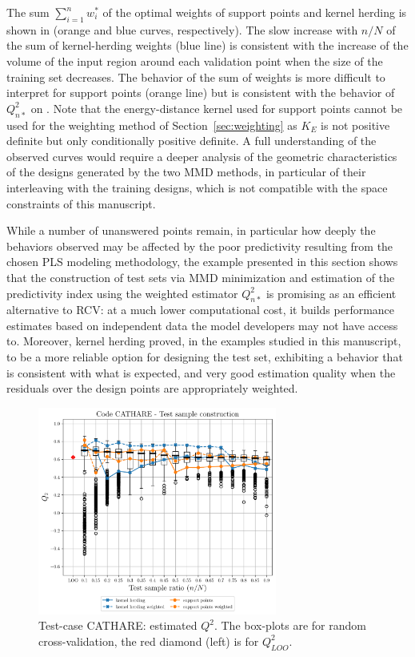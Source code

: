 The sum $\sum_{i=1}^n w_i^*$ of the optimal weights of support points and kernel herding  is shown in  (orange and blue curves, respectively). 
The slow increase with $n/N$ of the sum of kernel-herding weights (blue line) is consistent with the increase of the volume of the input region around each validation point when the size of the training set decreases. 
The behavior of the sum of weights is more difficult to interpret for support points (orange line) but is consistent with the behavior of $Q_{n*}^2$ on . 
Note that the energy-distance kernel  used for support points cannot be used for the weighting method of Section~\ref{sec:weighting} as $K_E$ is not positive definite but only conditionally positive definite. 
A full understanding of the observed curves would require a deeper analysis of the geometric characteristics of the designs generated by the two MMD methods, in particular of their interleaving with the training designs, which is not compatible with the space constraints of this manuscript. 

While a number of unanswered points remain, in particular how deeply the behaviors observed may be affected by the poor predictivity resulting from the chosen PLS modeling methodology, the example presented in this section shows that the construction of test sets via MMD minimization and estimation of the predictivity index using the weighted estimator $Q_{n*}^2$ is promising as an efficient alternative to RCV: at a much lower computational cost, it builds performance estimates based on independent data the model developers may not have access to. 
Moreover, kernel herding proved, in the examples studied in this manuscript, to be a more reliable option for designing the test set, exhibiting a behavior that is consistent with what is expected, and very good estimation quality when the residuals over the design points are appropriately weighted.

\begin{figure}
  \centering
  \includegraphics[width=0.7\textwidth]{./part2/figures/SIS/cathareC2.pdf}
  \caption{Test-case CATHARE: estimated $Q^2$. The box-plots are for random cross-validation, the red diamond (left) is for $Q^2_{LOO}$.}
  \label{fig:cathareC2_benchmark}
\end{figure}

